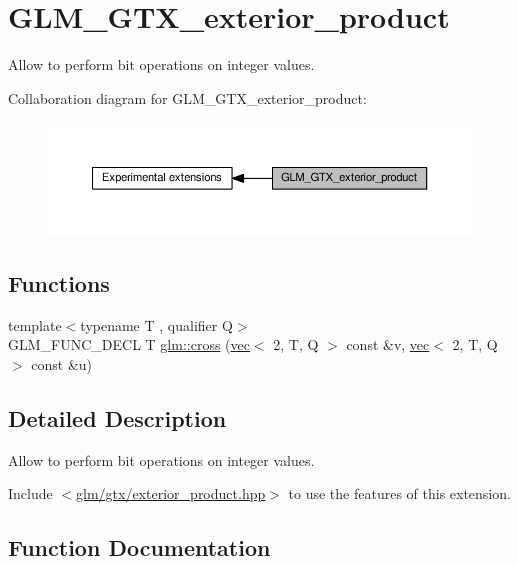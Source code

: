 \hypertarget{group__gtx__exterior__product}{}\section{G\+L\+M\+\_\+\+G\+T\+X\+\_\+exterior\+\_\+product}
\label{group__gtx__exterior__product}


Allow to perform bit operations on integer values.  


Collaboration diagram for G\+L\+M\+\_\+\+G\+T\+X\+\_\+exterior\+\_\+product\+:
\nopagebreak
\begin{figure}[H]
\begin{center}
\leavevmode
\includegraphics[width=350pt]{d2/d37/group__gtx__exterior__product}
\end{center}
\end{figure}
\subsection*{Functions}
\begin{DoxyCompactItemize}
\item 
{\footnotesize template$<$typename T , qualifier Q$>$ }\\G\+L\+M\+\_\+\+F\+U\+N\+C\+\_\+\+D\+E\+CL T \hyperlink{group__gtx__exterior__product_gac36e72b934ea6a9dd313772d7e78fa93}{glm\+::cross} (\hyperlink{structglm_1_1vec}{vec}$<$ 2, T, Q $>$ const \&v, \hyperlink{structglm_1_1vec}{vec}$<$ 2, T, Q $>$ const \&u)
\end{DoxyCompactItemize}


\subsection{Detailed Description}
Allow to perform bit operations on integer values. 

Include $<$\hyperlink{exterior__product_8hpp}{glm/gtx/exterior\+\_\+product.\+hpp}$>$ to use the features of this extension. 

\subsection{Function Documentation}
\mbox{\label{group__gtx__exterior__product_gac36e72b934ea6a9dd313772d7e78fa93}} 
